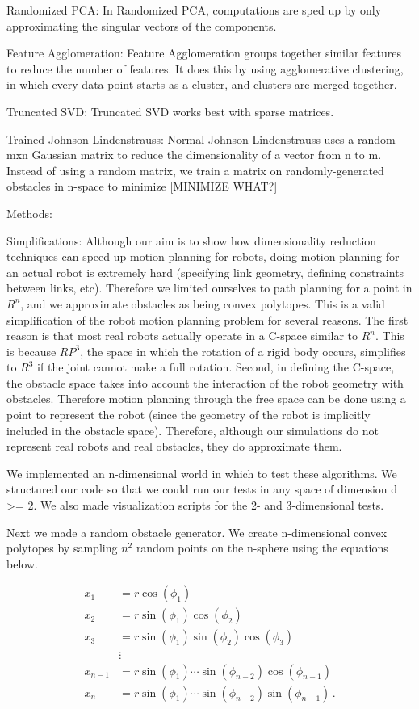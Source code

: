 \documentclass[12pt]{article}
\begin{document}
Randomized PCA: In Randomized PCA, computations are sped up by only approximating the singular vectors of the components.

Feature Agglomeration: Feature Agglomeration groups together similar features to reduce the number of features. It does this by using agglomerative clustering, in which every data point starts as a cluster, and clusters are merged together.

Truncated SVD: Truncated SVD works best with sparse matrices.

Trained Johnson-Lindenstrauss: Normal Johnson-Lindenstrauss uses a random mxn Gaussian matrix to reduce the dimensionality of a vector from n to m. Instead of using a random matrix, we train a matrix on randomly-generated obstacles in n-space to minimize [MINIMIZE WHAT?]

Methods:

Simplifications: Although our aim is to show how dimensionality reduction techniques can speed up motion planning for robots, doing motion planning for an actual robot is extremely hard (specifying link geometry, defining constraints between links, etc). Therefore we limited ourselves to path planning for a point in $R^{n}$, and we approximate obstacles as being convex polytopes. This is a valid simplification of the robot motion planning problem for several reasons. The first reason is that most real robots actually operate in a C-space similar to $R^{n}$. This is because $RP^{3}$, the space in which the rotation of a rigid body occurs, simplifies to $R^{3}$ if the joint cannot make a full rotation. Second, in defining the C-space, the obstacle space takes into account the interaction of the robot geometry with obstacles. Therefore motion planning through the free space can be done using a point to represent the robot (since the geometry of the robot is implicitly included in the obstacle space). Therefore, although our simulations do not represent real robots and real obstacles, they do approximate them.

We implemented an n-dimensional world in which to test these algorithms. We structured our code so that we could run our tests in any space of dimension d >= 2. We also made visualization scripts for the 2- and 3-dimensional tests.

Next we made a random obstacle generator. We create n-dimensional convex polytopes by sampling $n^{2}$ random points on the n-sphere using the equations below. 

\begin{align}
x_1 &= r \cos(\phi_1) \\
x_2 &= r \sin(\phi_1) \cos(\phi_2) \\
x_3 &= r \sin(\phi_1) \sin(\phi_2) \cos(\phi_3) \\
    &\vdots\\
x_{n-1} &= r \sin(\phi_1) \cdots \sin(\phi_{n-2}) \cos(\phi_{n-1}) \\
x_n &= r \sin(\phi_1) \cdots \sin(\phi_{n-2}) \sin(\phi_{n-1}) \,.
\end{align}
\end{document}
